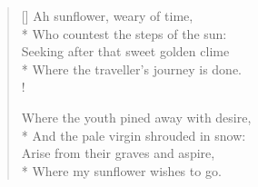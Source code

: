 \documentclass[MAIN]{subfiles}
\begin{document}
\settowidth{\versewidth}{\vin Where the traveller's journey is done.}
\begin{verse}[\versewidth]
Ah sunflower, weary of time,\\*
\vin Who countest the steps of the sun:\\
Seeking after that sweet golden clime\\*
\vin Where the traveller's journey is done.\\!

Where the youth pined away with desire,\\*
\vin And the pale virgin shrouded in snow:\\
Arise from their graves and aspire,\\*
\vin Where my sunflower wishes to go.
\end{verse}
\end{document}
